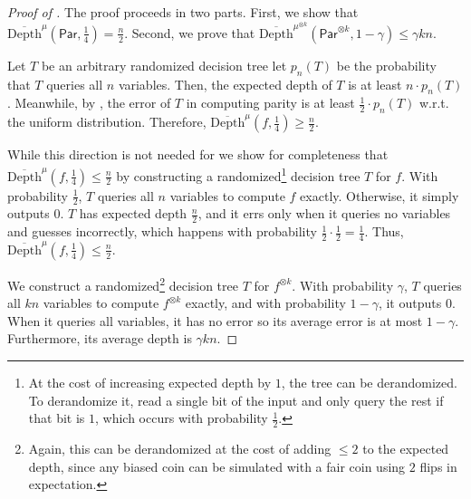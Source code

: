\documentclass[11pt]{article}
\newcommand{\pparagraph}[1]{\bigskip \noindent {\bf {#1}}}
\begin{document}
\begin{proof}[Proof of ]
The proof proceeds in two parts. First, we show that $\overline{\text{Depth}}^\mu(\mathsf{Par}, \tfrac{1}{4})= \frac{n}{2}$. Second, we prove that  $\overline{\text{Depth}}^{\mu^{\otimes k}}(\mathsf{Par}^{\otimes k}, 1 -\gamma) \leq \gamma k n$.

\pparagraph{(1) $\overline{\mathrm{Depth}}^\mu(\mathsf{Par}, \tfrac{1}{4})= \tfrac{n}{2}$.} Let $T$ be an arbitrary randomized decision tree let $p_n(T)$ be the probability that $T$ queries all $n$ variables. Then, the expected depth of $T$ is at least $n \cdot p_n(T)$. Meanwhile, by , the error of $T$ in computing parity is at least $\frac1{2} \cdot p_n(T)$ w.r.t. the uniform distribution. Therefore, $\overline{\text{Depth}}^\mu(f, \frac1{4}) \geq \frac{n}{2}$.

While this direction is not needed for  we show for completeness that $\overline{\text{Depth}}^\mu(f, \frac1{4}) \leq \frac{n}{2}$ by constructing a randomized\footnote{At the cost of increasing expected depth by $1$, the tree can be derandomized. To derandomize it, read a single bit of the input and only query the rest if that bit is $1$, which occurs with probability $\tfrac{1}{2}$.} decision tree $T$ for $f$.
 With probability $\frac1{2}$, $T$ queries all $n$ variables to compute $f$ exactly. Otherwise, it simply outputs $0$. $T$ has expected depth $\frac{n}{2}$, and it errs only when it queries no variables and guesses incorrectly, which happens with probability $\frac1{2}\cdot \frac1{2}= \frac1{4}$. Thus, $\overline{\text{Depth}}^\mu(f, \frac1{4}) \leq \frac{n}{2}$. 




\pparagraph{(2)  $\overline{\mathrm{Depth}}^{\mu^{\otimes k}}(f^{\otimes k}, 1 -\gamma) \leq  \gamma k n$.} We construct a randomized\footnote{Again, this can be derandomized at the cost of adding 
$\leq 2$ to the expected depth, since any biased coin can be simulated with a fair coin using $2$ flips in expectation.} decision tree $T$ for $f^{\otimes k}$. With probability $\gamma$, $T$ queries all $kn$ variables to compute $f^{\otimes k}$ exactly, and with probability $1-\gamma$, it outputs 0. When it queries all variables, it has no error so its average error is at most $1 - \gamma$. Furthermore, its average depth is $\gamma k n$.
\end{proof}
\end{document}
